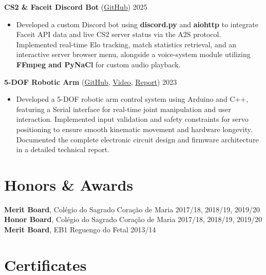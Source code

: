 \documentclass[11pt,a4paper]{article}
\begin{document}
\noindent \textbf{CS2 \& Faceit Discord Bot} (\href{https://github.com/CARVALHOCENT/Discord-Bot-CS2}{GitHub}) \hfill 2025 
\begin{itemize}[leftmargin=15pt, label={$\bullet$}]
    \item Developed a custom Discord bot using \textbf{discord.py} and \textbf{aiohttp} to integrate Faceit API data and live CS2 server status via the A2S protocol. Implemented real-time Elo tracking, match statistics retrieval, and an interactive server browser menu, alongside a voice-system module utilizing \textbf{FFmpeg and PyNaCl} for custom audio playback.
\end{itemize}

\vspace{6pt}

\noindent \textbf{5-DOF Robotic Arm} (\href{https://github.com/CARVALHOCENT/RobotArm}{GitHub}, \href{https://www.youtube.com/watch?v=mb50L6tp-c0}{Video}, \href{https://github.com/CARVALHOCENT/RobotArm/blob/main/Projeto_Fisica_e_API.pdf}{Report}) \hfill 2023 
\begin{itemize}[leftmargin=15pt, label={$\bullet$}]
    \item Developed a 5-DOF robotic arm control system using Arduino and C++, featuring a Serial interface for real-time joint manipulation and user interaction. Implemented input validation and safety constraints for servo positioning to ensure smooth kinematic movement and hardware longevity. Documented the complete electronic circuit design and firmware architecture in a detailed technical report.
\end{itemize}

\section*{Honors \& Awards}

\noindent \textbf{Merit Board}, Colégio do Sagrado Coração de Maria \hfill 2017/18, 2018/19, 2019/20 \\
\noindent \textbf{Honor Board}, Colégio do Sagrado Coração de Maria \hfill 2017/18, 2018/19, 2019/20 \\
\noindent \textbf{Merit Board}, EB1 Reguengo do Fetal \hfill 2013/14 \\

\section*{Certificates}
\end{document}
